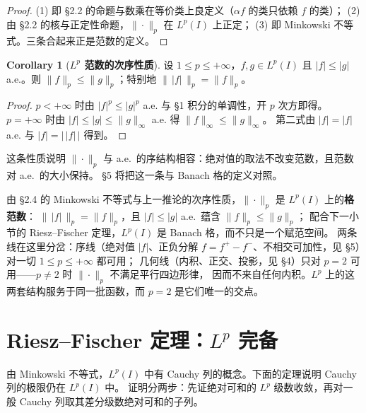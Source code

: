 \documentclass[oneside]{book}
\theoremstyle{definition}
\theoremstyle{definition}
\newtheorem{corollary}{Corollary}[section]
\begin{document}
	\begin{proof}
		(1) 即 §2.2 的命题与数乘在等价类上良定义（$\alpha f$ 的类只依赖 $f$ 的类）；
		(2) 由 §2.2 的核与正定性命题，$\|\cdot\|_p$ 在 $L^p(I)$ 上正定；
		(3) 即 Minkowski 不等式。三条合起来正是范数的定义。
	\end{proof}
	
	\begin{corollary}[\bfseries{$L^p$ 范数的次序性质}]
		设 $1\leqslant p\leqslant+\infty$，$f,g\in L^p(I)$ 且 $|f|\leqslant|g|$ a.e.。则
		$\|f\|_p\leqslant\|g\|_p$；特别地 $\bigl\|\,|f|\,\bigr\|_p=\|f\|_p$。
	\end{corollary}
	
	\begin{proof}
		$p<+\infty$ 时由 $|f|^p\leqslant|g|^p$ a.e. 与 §1 积分的单调性，开 $p$ 次方即得。
		$p=+\infty$ 时由 $|f|\leqslant|g|\leqslant\|g\|_\infty$ a.e. 得 $\|f\|_\infty\leqslant\|g\|_\infty$。
		第二式由 $|f|=|f|$ a.e. 与 $|f|=|\,|f|\,|$ 得到。
	\end{proof}
	
	这条性质说明 $\|\cdot\|_p$ 与 a.e.\ 的序结构相容：绝对值的取法不改变范数，且范数对 a.e.\ 的大小保持。
	§5 将把这一条与 Banach 格的定义对照。
	
	\begin{link}
		由 §2.4 的 Minkowski 不等式与上一推论的次序性质，$\|\cdot\|_p$ 是 $L^p(I)$ 上的\textbf{格范数}：
		$\bigl\|\,|f|\,\bigr\|_p=\|f\|_p$，且 $|f|\leqslant|g|$ a.e.\ 蕴含 $\|f\|_p\leqslant\|g\|_p$；
		配合下一小节的 Riesz--Fischer 定理，$L^p(I)$ 是 Banach 格，而不只是一个赋范空间。
		两条线在这里分岔：序线（绝对值 $|f|$、正负分解 $f=f^+-f^-$、不相交可加性，见 §5）对一切 $1\leqslant p\leqslant+\infty$ 都可用；
		几何线（内积、正交、投影，见 §4）只对 $p=2$ 可用——$p\ne2$ 时 $\|\cdot\|_p$ 不满足平行四边形律，
		因而不来自任何内积。$L^p$ 上的这两套结构服务于同一批函数，而 $p=2$ 是它们唯一的交点。
	\end{link}
	
	\section{Riesz--Fischer 定理：$L^p$ 完备}
	
	由 Minkowski 不等式，$L^p(I)$ 中有 Cauchy 列的概念。下面的定理说明 Cauchy 列的极限仍在 $L^p(I)$ 中。
	证明分两步：先证绝对可和的 $L^p$ 级数收敛，再对一般 Cauchy 列取其差分级数绝对可和的子列。
	
\end{document}
